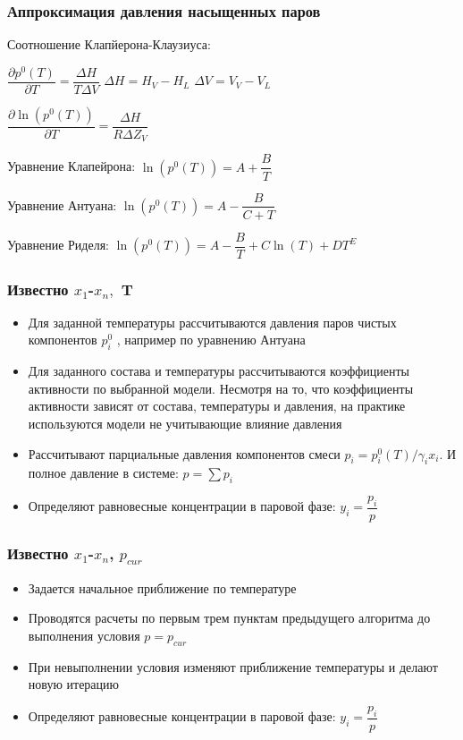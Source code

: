 \begin{frame}
	\frametitle{Аппроксимация давления насыщенных паров}
	Соотношение Клапйерона-Клаузиуса:
	
	$\dfrac{\partial p^0( T )} { \partial T } = \dfrac{ \Delta H } { T \Delta V }$
	$ \Delta H = H_V -H_L$
	$ \Delta V = V_V -V_L$
	
	$\dfrac{\partial \ln( p^0( T ))} { \partial T } = \dfrac{ \Delta H } { R \Delta Z_V }$
	
	Уравнение Клапейрона:
	 $\ln( p^0( T ))  = A + \dfrac{B} {T}$
	 
	 Уравнение Антуана:
	 $ \ln( p^0( T ))  = A - \dfrac{B} {C+T}$
	 
	 Уравнение Риделя:
	 $ \ln( p^0( T ))  = A - \dfrac{B} {T} + C \ln( T ) + D T^E$
\end{frame}


\begin{frame}
	\frametitle{Известно $x_1$-$x_n,$ T }
	\begin{itemize}
		\item Для заданной температуры рассчитываются давления паров чистых компонентов $p^0_i$ , например по уравнению Антуана
		\item Для заданного состава и температуры рассчитываются коэффициенты активности по выбранной модели. Несмотря на то, что коэффициенты активности зависят от состава, температуры и давления, на практике используются модели не учитывающие влияние давления
		\item Рассчитывают парциальные давления компонентов смеси $p_i = p_i^0( T ) /\gamma_i x_i$. И полное давление в системе: $p= \sum p_i$
		\item Определяют равновесные концентрации в паровой фазе: $y_i = \dfrac{p_i} {p}$
	\end{itemize}
\end{frame}

\begin{frame}
	\frametitle{Известно $x_1$-$x_n$, $p_{cur}$ }
	\begin{itemize}
		\item Задается начальное приближение по температуре
		\item Проводятся расчеты по первым трем пунктам предыдущего алгоритма до выполнения условия $p=p_{cur}$
		\item При невыполнении условия изменяют приближение температуры и делают новую итерацию
		\item Определяют равновесные концентрации в паровой фазе: $y_i = \dfrac {p_i} {p}$
		
	\end{itemize}
	
\end{frame}

